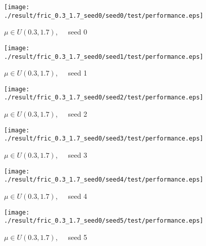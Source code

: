 \begin{figure}[p]
 \begin{minipage}{0.49\hsize}
  \begin{center}
 \texttt{[image: ./result/fric\_0.3\_1.7\_seed0/seed0/test/performance.eps]}
  \caption{$\mu\in U(0.3,1.7)$,~~~seed 0
  }
  \end{center}
 \end{minipage}
 \begin{minipage}{0.49\hsize}
   \begin{center}
 \texttt{[image: ./result/fric\_0.3\_1.7\_seed0/seed1/test/performance.eps]}
  \caption{$\mu\in U(0.3,1.7)$,~~~seed 1
  }
  \end{center}
 \end{minipage}
\end{figure}

\begin{figure}[p]
 \begin{minipage}{0.49\hsize}
  \begin{center}
 \texttt{[image: ./result/fric\_0.3\_1.7\_seed0/seed2/test/performance.eps]}
  \caption{$\mu\in U(0.3,1.7)$,~~~seed 2
  }
  \end{center}
 \end{minipage}
 \begin{minipage}{0.49\hsize}
   \begin{center}
 \texttt{[image: ./result/fric\_0.3\_1.7\_seed0/seed3/test/performance.eps]}
  \caption{$\mu\in U(0.3,1.7)$,~~~seed 3
  }
  \end{center}
 \end{minipage}
\end{figure}

\begin{figure}[p]
 \begin{minipage}{0.49\hsize}
  \begin{center}
 \texttt{[image: ./result/fric\_0.3\_1.7\_seed0/seed4/test/performance.eps]}
  \caption{$\mu\in U(0.3,1.7)$,~~~seed 4
  }
  \end{center}
 \end{minipage}
 \begin{minipage}{0.49\hsize}
   \begin{center}
 \texttt{[image: ./result/fric\_0.3\_1.7\_seed0/seed5/test/performance.eps]}
  \caption{$\mu\in U(0.3,1.7)$,~~~seed 5
  }
  \end{center}
 \end{minipage}
\end{figure}
